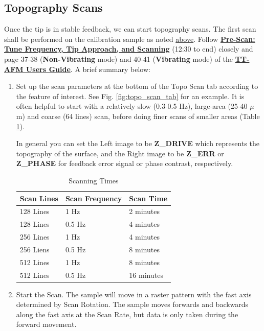 \documentclass{../lab}
\newcommand{\afmuserguide}{\href{https://berkeley-physics111b.github.io/assets/pdf/oldwebsitestructure/AFMImages/TT_AFM\%20User-Guide-V2.2-600DPI.pdf}{\textbf{TT-AFM Users Guide}}}
\begin{document}
\subsection{Topography Scans}

Once the tip is in stable feedback, we can start topography scans. The first scan shall be performed on the calibration sample as noted \hyperref[subsec:HowToLoadASample]{above}. Follow \href{https://berkeley-physics111b.github.io/assets/pdf/oldwebsitestructure/prescan\_final2.mp4}{\textbf{Pre-Scan: Tune Frequency, Tip Approach, and Scanning}} (12:30 to end) closely and page 37-38 (\textbf{Non-Vibrating} mode) and 40-41 (\textbf{Vibrating} mode) of the \afmuserguide. A brief summary below:

\begin{enumerate}
    \item Set up the scan parameters at the bottom of the {Topo Scan} tab according to the feature of interest. See Fig. \ref{fig:topo_scan_tab} for an example. It is often helpful to start with a relatively slow (0.3-0.5 Hz), large-area (25-40 $\mu$m) and coarse (64 lines) scan, before doing finer scans of smaller areas (Table \ref{tab:scan_times}).
    
    In general you can set the Left image to be \textbf{Z\_DRIVE} which represents the topography of the surface, and the Right image to be \textbf{Z\_ERR} or \textbf{Z\_PHASE} for feedback error signal or phase contrast, respectively.

    \begin{table}[H]
        \centering
        \begin{tabular}{l|l|l}
            Scan Lines & Scan Frequency & Scan Time \\\hline
            128 Lines  & 1 Hz           & 2 minutes \\\hline
            128 Lines  & 0.5 Hz         & 4 minutes \\\hline
            256 Lines  & 1 Hz           & 4 minutes \\\hline
            256 Liens  & 0.5 Hz         & 8 minutes \\\hline
            512 Lines  & 1 Hz           & 8 minutes \\\hline
            512 Lines  & 0.5 Hz         & 16 minutes
        \end{tabular}
        \caption{Scanning Times}
        \label{tab:scan_times}
    \end{table}
        
    \item Start the Scan. The sample will move in a raster pattern with the fast axis determined by Scan Rotation. The sample moves forwards and backwards along the fast axis at the Scan Rate, but data is only taken during the forward movement.  
      

\end{enumerate}
\end{document}
